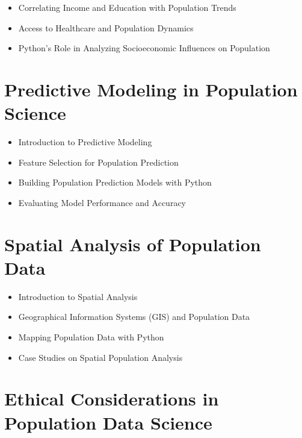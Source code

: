 \documentclass[
]{book}
\providecommand{\tightlist}{%
  \setlength{\itemsep}{0pt}\setlength{\parskip}{0pt}}\usepackage{longtable,booktabs,array}
\begin{document}
\begin{itemize}
\tightlist
\item
  Correlating Income and Education with Population Trends
\item
  Access to Healthcare and Population Dynamics
\item
  Python's Role in Analyzing Socioeconomic Influences on Population
\end{itemize}

\hypertarget{predictive-modeling-in-population-science}{%
\chapter{\texorpdfstring{\textbf{Predictive Modeling in Population
Science}}{Predictive Modeling in Population Science}}\label{predictive-modeling-in-population-science}}

\begin{itemize}
\tightlist
\item
  Introduction to Predictive Modeling
\item
  Feature Selection for Population Prediction
\item
  Building Population Prediction Models with Python
\item
  Evaluating Model Performance and Accuracy
\end{itemize}

\hypertarget{spatial-analysis-of-population-data}{%
\chapter{\texorpdfstring{\textbf{Spatial Analysis of Population
Data}}{Spatial Analysis of Population Data}}\label{spatial-analysis-of-population-data}}

\begin{itemize}
\tightlist
\item
  Introduction to Spatial Analysis
\item
  Geographical Information Systems (GIS) and Population Data
\item
  Mapping Population Data with Python
\item
  Case Studies on Spatial Population Analysis
\end{itemize}

\hypertarget{ethical-considerations-in-population-data-science}{%
\chapter{\texorpdfstring{\textbf{Ethical Considerations in Population
Data
Science}}{Ethical Considerations in Population Data Science}}\label{ethical-considerations-in-population-data-science}}
\end{document}

